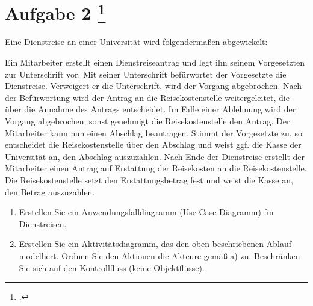 \documentclass{lehramt-informatik-aufgabe}
\begin{document}
\section{Aufgabe 2
\footcite{examen:66116:2019:09}}

Eine Dienstreise an einer Universität wird folgendermaßen abgewickelt:

Ein Mitarbeiter erstellt einen Dienstreiseantrag und legt ihn seinem
Vorgesetzten zur Unterschrift vor. Mit seiner Unterschrift befürwortet
der Vorgesetzte die Dienstreise. Verweigert er die Unterschrift, wird
der Vorgang abgebrochen. Nach der Befürwortung wird der Antrag an die
Reisekostenstelle weitergeleitet, die über die Annahme des Antrags
entscheidet. Im Falle einer Ablehnung wird der Vorgang abgebrochen;
sonst genehmigt die Reisekostenstelle den Antrag. Der Mitarbeiter kann
nun einen Abschlag beantragen. Stimmt der Vorgesetzte zu, so entscheidet
die Reisekostenstelle über den Abschlag und weist ggf. die Kasse der
Universität an, den Abschlag auszuzahlen. Nach Ende der Dienstreise
erstellt der Mitarbeiter einen Antrag auf Erstattung der Reisekosten an
die Reisekostenstelle. Die Reisekostenstelle setzt den Erstattungsbetrag
fest und weist die Kasse an, den Betrag auszuzahlen.

\begin{enumerate}

\item Erstellen Sie ein Anwendungsfalldiagramm (Use-Case-Diagramm) für
Dienstreisen.


\item Erstellen Sie ein Aktivitätsdiagramm, das den oben beschriebenen
Ablauf modelliert. Ordnen Sie den Aktionen die Akteure gemäß a) zu.
Beschränken Sie sich auf den Kontrollfluss (keine Objektflüsse).
\end{enumerate}
\end{document}
